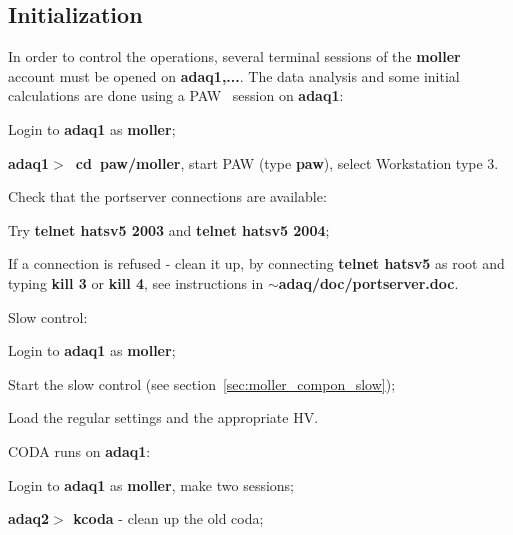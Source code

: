 {\subsection {Initialization}
\label{sec:moller_oper_initial}
\vspace{-\parskip}
In order to control the operations, several terminal sessions
of the {\bf moller} account must be opened on {\bf adaq1,...}.
The data analysis and some initial calculations are done using a PAW~\cite{PAWwww}
session on  {\bf adaq1}:
 \begin{list}{--}{\setlength{\itemsep}{-0.15cm}}
   \item Login to {\bf adaq1} as {\bf moller};
   \item {\bf adaq1$>$~cd~paw/moller}, start PAW (type {\bf paw}), select Workstation type 3.  
 \end{list}
\noindent
\vspace{-\parskip}
Check that the portserver connections are available:
 \begin{list}{--}{\setlength{\itemsep}{-0.15cm}}
   \item Try {\bf telnet hatsv5 2003} and {\bf telnet hatsv5 2004};
   \item If a connection is refused - clean it up, by connecting
         {\bf telnet hatsv5} as root and typing {\bf kill 3} or {\bf kill 4},
         see instructions in {\bf $\sim$adaq/doc/portserver.doc}.    
 \end{list}
\noindent
\vspace{-\parskip}
Slow control:
 \begin{list}{--}{\setlength{\itemsep}{-0.15cm}}
   \item Login to {\bf adaq1} as {\bf moller};
   \item Start the slow control (see section~\ref{sec:moller_compon_slow});
   \item Load the regular settings and the appropriate HV.
 \end{list}
\noindent
\vspace{-\parskip}
CODA runs on {\bf adaq1}: 
 \begin{list}{--}{\setlength{\itemsep}{-0.15cm}}
   \item Login to {\bf adaq1} as {\bf moller}, make two sessions;
   \item {\bf adaq2$>$ kcoda} - clean up the old coda;

\end{list}}
